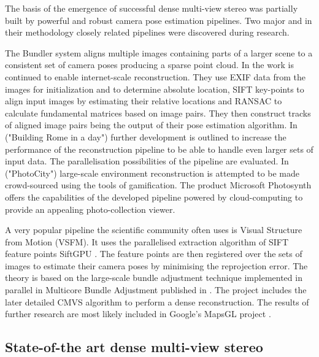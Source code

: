 \documentclass{ucl_thesis}
\begin{document}
The basis of the emergence of successful dense multi-view stereo was partially built by powerful and robust camera pose estimation pipelines. Two major and in their methodology closely related pipelines were discovered during research. 
\par The Bundler \cite{SnavelySS06} system aligns multiple images containing parts of a larger scene to a consistent set of camera poses producing a sparse point cloud. In \cite{SNAVELY-IJCV08} the work is continued to enable internet-scale reconstruction. They use EXIF data from the images for initialization and to determine absolute location, SIFT key-points \cite{Lowe04} to align input images by estimating their relative locations and RANSAC \cite{fischler1981random} to calculate fundamental matrices based on image pairs. They then construct tracks of aligned image pairs being the output of their pose estimation algorithm. 
In \cite{AgarwalFSSCSS11} ("Building Rome in a day") further development is outlined to increase the performance of the reconstruction pipeline to be able to handle even larger sets of input data. The parallelisation possibilities of the pipeline are evaluated. In \cite{Tuite:2011:PTE:1978942.1979146}  ("PhotoCity") large-scale environment reconstruction is attempted to be made crowd-sourced using the tools of gamification. The product Microsoft Photosynth \cite{Photosynth} offers the capabilities of the developed pipeline powered by cloud-computing to provide an appealing photo-collection viewer. \\

\par A very popular pipeline the scientific community often uses is Visual Structure from Motion (VSFM). It uses the parallelised extraction algorithm of SIFT feature points SiftGPU \cite{siftgpu07wu}. The feature points are then registered over the sets of images to estimate their camera poses by minimising the reprojection error. The theory is based on the large-scale bundle adjustment technique \cite{agarwal2010bundle} implemented in parallel in Multicore Bundle Adjustment published in \cite{CWu11}. The project includes the later detailed CMVS \cite{FurukawaCSS10} algorithm to perform a dense reconstruction. The results of further research are most likely included in Google's MapsGL project \cite{MGL}.

\subsection{State-of-the art dense multi-view stereo} 
\label{sotadense}
\end{document}
